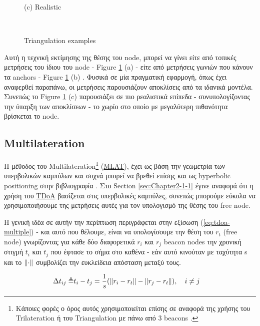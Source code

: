 \begin{figure} [H]
\begin{minipage}{.4\textwidth}
		{(c) Realistic}
	\end{minipage}
	\hfill \break \\
	\decoRule
	\caption[Triangulation examples]{Triangulation examples}
	\label{fig:Triangulation-examples}
\end{figure}

Αυτή η τεχνική εκτίμησης της θέσης του node, μπορεί να γίνει είτε από τοπικές μετρήσεις του ίδιου του node -
Figure \ref{fig:Triangulation-examples} (a) - είτε από μετρήσεις γωνιών που κάνουν τα anchors - Figure \ref{fig:Triangulation-examples} (b)
\cite{wsn-Localization-systems}. Φυσικά σε μία πραγματική εφαρμογή, όπως έχει αναφερθεί παραπάνω, οι μετρήσεις παρουσιάζουν αποκλίσεις 
από τα ιδανικά μοντέλα. Συνεπώς το Figure \ref{fig:Triangulation-examples} (c) παρουσιάζει σε πιο ρεαλιστικά επίπεδα - συνυπολογίζοντας την ύπαρξη 
των αποκλίσεων - 
το χωρίο στο οποίο με μεγαλύτερη πιθανότητα βρίσκεται το node.

\subsection{Multilateration} \label{sec:Multilateration}
Η μέθοδος του Multilateration\footnote{Κάποιες φορές ο όρος αυτός χρησιμοποιείται επίσης σε αναφορά της χρήσης του Trilateration ή του Triangulation με πάνω από 3 beacons \cite{wsn-Localization-systems} \cite{triangulation-simple-equation}.} (\hyperref[abbr:MLAT]{MLAT}), 
έχει ως βάση την γεωμετρία των υπερβολικών καμπύλων και συχνά μπορεί να βρεθεί επίσης και ως hyperbolic positioning 
στην βιβλιογραφία \cite{multilateration-def} \cite{triangulation-trilateration-multilateration} \cite{wikipedia-multilateration}. Στο Section \ref{sec:Chapter2-1-1} 
έγινε αναφορά ότι η χρήση του \hyperref[abbr:TDoA]{TDoA} βασίζεται στις υπερβολικές καμπύλες, συνεπώς μπορούμε εύκολα να χρησιμοποιήσουμε
της μετρήσεις αυτές για τον υπολογισμό της θέσης του free node.

Η γενική ιδέα σε αυτήν την περίπτωση περιγράφεται στην εξίσωση (\ref{eq:tdoa-multiple}) \cite{wsn-Localization-techniques} \cite{simple-tdoa} - και αυτό που 
θέλουμε, είναι να υπολογίσουμε την θέση του $r_t$ (free node) γνωρίζοντας για κάθε δύο διαφορετικά $r_i$ και $r_j$ beacon nodes
την χρονική στιγμή $t_i$ και $t_j$ που έφτασε το σήμα στο καθένα - εάν αυτό κινούταν με ταχύτητα s και το $\left\lVert\cdot\right\rVert$ συμβολίζει την ευκλείδεια
απόσταση μεταξύ τους.

\begin{align}
	\Delta t_{ij} \triangleq & t_i - t_j = \frac{1}{s} (\left\lVert r_i - r_t\right\rVert - \left\lVert r_j - r_t\right\rVert), \quad i \neq j\label{eq:tdoa-multiple}
\end{align}


